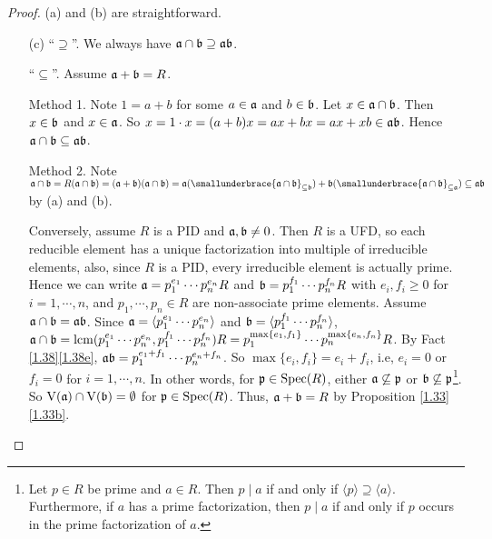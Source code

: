 \begin{proof}
    (a) and (b) are straightforward.
    \begin{enumerate}
        \item [(c)]
            ``$\supseteq$''. We always have $\mathfrak{a} \cap \mathfrak{b} \supseteq \mathfrak{a} \mathfrak{b}$. \par 
            ``$\subseteq$''. Assume $\mathfrak{a} + \mathfrak{b} = R$.  \par 
            Method 1. Note $1 = a+b$ for some $a \in \mathfrak{a}$ and $b \in \mathfrak{b}$. Let $x \in \mathfrak{a} \cap \mathfrak{b}$. Then $x \in \mathfrak{b}$ and $x \in \mathfrak{a}$. So $x = 1 \cdot x = (a+b)x = ax + bx = ax + xb \in \operatorname{\mathfrak{a} \mathfrak{b}}$. Hence $\mathfrak{a} \cap \mathfrak{b} \subseteq \mathfrak{a} \mathfrak{b}$. \par 
            Method 2. Note $\ffa \cap \ffb = R(\ffa \cap \ffb) = (\ffa + \ffb)(\ffa \cap \ffb) = \ffa(\smallunderbrace{\ffa \cap \ffb}_{\subseteq \ffb}) + \ffb(\smallunderbrace{\ffa \cap \ffb}_{\subseteq \ffa}) \subseteq \ffa \ffb$ by (a) and (b). \par
            Conversely, assume $R$ is a PID and $\mathfrak{a},\mathfrak{b} \neq 0$. Then $R$ is a UFD, so each reducible element has a unique factorization into multiple of irreducible elements, also, since $R$ is a PID, every irreducible element is actually prime.  Hence we can write $\mathfrak{a} = p_1^{e_1} \cdots p_n^{e_n} R$ and $\mathfrak{b} = p_1^{f_1} \cdots p_n^{f_n}R$ with $e_i,f_i \geq 0$ for $i = 1,\cdots,n$, and $p_1,\cdots,p_n \in R$ are non-associate prime elements. Assume $\mathfrak{a} \cap \mathfrak{b} = \mathfrak{a} \mathfrak{b}$. Since $\mathfrak{a} = \langle p_1^{e_1} \cdots p_n^{e_n} \rangle$ and $\mathfrak{b} = \langle p_1^{f_1} \cdots p_n^{f_n} \rangle$, $\mathfrak{a} \cap \mathfrak{b} = \operatorname{lcm}(p_1^{e_1} \cdots p_n^{e_n},p_1^{f_1} \cdots p_n^{f_n})R = p_1^{\max\{e_1,f_1\}} \cdots p_n^{\max\{e_n,f_n\}}R$. By Fact \ref{1.38}\ref{1.38e}, $\mathfrak{a}\mathfrak{b} = p_1^{e_1+f_1} \cdots p_n^{e_n+f_n}$. So $\max\{e_i,f_i\} = e_i + f_i$, i.e, $e_i = 0$ or $f_i = 0$ for $i = 1,\cdots,n$. In other words, for $\mathfrak{p} \in \operatorname{Spec}(R)$, either $\mathfrak{a} \not \subseteq \mathfrak{p}$ or $\mathfrak{b} \not \subseteq \mathfrak{p}$\footnote[2]{Let $p \in R$ be prime and $a \in R$. Then $p \mid a$ if and only if $\langle p \rangle \supseteq \langle a \rangle$. Furthermore, if $a$ has a prime factorization, then $p \mid a$ if and only if $p$ occurs in the prime factorization of $a$.}. So $\operatorname{V}(\mathfrak{a}) \cap \operatorname{V}(\mathfrak{b}) = \emptyset$ for $\mathfrak{p} \in \operatorname{Spec}(R)$. Thus, $\mathfrak{a} + \mathfrak{b} = R$ by Proposition \ref{1.33}\ref{1.33b}. \qedhere
    \end{enumerate}
\end{proof}

